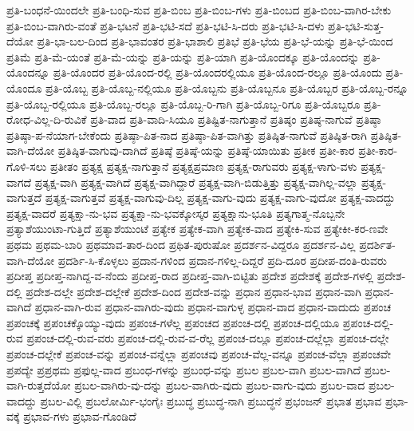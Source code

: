{ಪ್ರತಿ-ಬಂಧನೆ-ಯಿಂದಲೇ
ಪ್ರತಿ-ಬಂಧಿ-ಸುವ
ಪ್ರತಿ-ಬಿಂಬ
ಪ್ರತಿ-ಬಿಂಬ-ಗಳು
ಪ್ರತಿ-ಬಿಂಬದ
ಪ್ರತಿ-ಬಿಂಬ-ವಾಗಿರ-ಬೇಕು
ಪ್ರತಿ-ಬಿಂಬ-ವಾಗಿರು-ವಂತೆ
ಪ್ರತಿ-ಭಟನೆ
ಪ್ರತಿ-ಭಟಿ-ಸದೆ
ಪ್ರತಿ-ಭಟಿ-ಸಿ-ದರು
ಪ್ರತಿ-ಭಟಿ-ಸಿ-ದಳು
ಪ್ರತಿ-ಭಟಿ-ಸುತ್ತ-ದೆಯೋ
ಪ್ರತಿ-ಭಾ-ಬಲ-ದಿಂದ
ಪ್ರತಿ-ಭಾವಂತರ
ಪ್ರತಿ-ಭಾಶಾಲಿ
ಪ್ರತಿಭೆ
ಪ್ರತಿ-ಭೆಯ
ಪ್ರತಿ-ಭೆ-ಯನ್ನು
ಪ್ರತಿ-ಭೆ-ಯಿಂದ
ಪ್ರತಿಮೆ
ಪ್ರತಿ-ಮೆ-ಯಂತೆ
ಪ್ರತಿ-ಮೆ-ಯನ್ನು
ಪ್ರತಿ-ಯನ್ನು
ಪ್ರತಿ-ಯಾಗಿ
ಪ್ರತಿ-ಯೊಂದಕ್ಕೂ
ಪ್ರತಿ-ಯೊಂದನ್ನು
ಪ್ರತಿ-ಯೊಂದನ್ನೂ
ಪ್ರತಿ-ಯೊಂದರ
ಪ್ರತಿ-ಯೊಂದ-ರಲ್ಲಿ
ಪ್ರತಿ-ಯೊಂದರಲ್ಲಿಯೂ
ಪ್ರತಿ-ಯೊಂದ-ರಲ್ಲೂ
ಪ್ರತಿ-ಯೊಂದು
ಪ್ರತಿ-ಯೊಂದೂ
ಪ್ರತಿ-ಯೊಬ್ಬ
ಪ್ರತಿ-ಯೊಬ್ಬ-ನಲ್ಲಿಯೂ
ಪ್ರತಿ-ಯೊಬ್ಬನು
ಪ್ರತಿ-ಯೊಬ್ಬನೂ
ಪ್ರತಿ-ಯೊಬ್ಬರ
ಪ್ರತಿ-ಯೊಬ್ಬ-ರನ್ನೂ
ಪ್ರತಿ-ಯೊಬ್ಬ-ರಲ್ಲಿಯೂ
ಪ್ರತಿ-ಯೊಬ್ಬ-ರಲ್ಲೂ
ಪ್ರತಿ-ಯೊಬ್ಬ-ರಿ-ಗಾಗಿ
ಪ್ರತಿ-ಯೊಬ್ಬ-ರಿಗೂ
ಪ್ರತಿ-ಯೊಬ್ಬರೂ
ಪ್ರತಿ-ರೋಧ-ವಿಲ್ಲ-ದಿ-ರುವಿಕೆ
ಪ್ರತಿ-ವಾದ
ಪ್ರತಿ-ವಾದಿ-ಸಿಯೂ
ಪ್ರತಿಷ್ಟಿತ-ನಾಗುತ್ತಾನೆ
ಪ್ರತಿಷ್ಠಂ
ಪ್ರತಿಷ್ಠ-ನಾಗುವೆ
ಪ್ರತಿಷ್ಠಾ
ಪ್ರತಿಷ್ಠಾ-ಪ-ನೆಯಾಗ-ಬೇಕೆಂದು
ಪ್ರತಿಷ್ಠಾ-ಪಿತ-ನಾದ
ಪ್ರತಿಷ್ಠಾ-ಪಿತ-ವಾಗಿತ್ತು
ಪ್ರತಿಷ್ಠಿತ-ನಾಗುವೆ
ಪ್ರತಿಷ್ಠಿತ-ರಾಗಿ
ಪ್ರತಿಷ್ಠಿತ-ವಾಗಿ-ದೆಯೋ
ಪ್ರತಿಷ್ಠಿತ-ವಾಗುವು-ದಾಗಿದೆ
ಪ್ರತಿಷ್ಠೆ
ಪ್ರತಿಷ್ಠೆ-ಯನ್ನು
ಪ್ರತಿಷ್ಠೆ-ಯಾಯಿತು
ಪ್ರತೀಕ
ಪ್ರತೀ-ಕಾರ
ಪ್ರತೀ-ಕಾರ-ಗೊಳಿ-ಸಲು
ಪ್ರತೀತಂ
ಪ್ರತ್ಯಕ್ಷ
ಪ್ರತ್ಯಕ್ಷ-ನಾಗುತ್ತಾನೆ
ಪ್ರತ್ಯಕ್ಷಪ್ರಮಾಣ
ಪ್ರತ್ಯಕ್ಷ-ರಾಗುವರು
ಪ್ರತ್ಯಕ್ಷ-ಳಾಗು-ವಳು
ಪ್ರತ್ಯಕ್ಷ-ವಾಗದೆ
ಪ್ರತ್ಯಕ್ಷ-ವಾಗಿ
ಪ್ರತ್ಯಕ್ಷ-ವಾಗಿದೆ
ಪ್ರತ್ಯಕ್ಷ-ವಾಗಿದ್ದಾರೆ
ಪ್ರತ್ಯಕ್ಷ-ವಾಗಿ-ಬಿಡುತ್ತಿತ್ತು
ಪ್ರತ್ಯಕ್ಷ-ವಾಗಿಲ್ಲ-ವಲ್ಲಾ
ಪ್ರತ್ಯಕ್ಷ-ವಾಗುತ್ತದೆ
ಪ್ರತ್ಯಕ್ಷ-ವಾಗುತ್ತವೆ
ಪ್ರತ್ಯಕ್ಷ-ವಾಗುವು-ದಿಲ್ಲ
ಪ್ರತ್ಯಕ್ಷ-ವಾಗು-ವುದು
ಪ್ರತ್ಯಕ್ಷ-ವಾಗು-ವುದೋ
ಪ್ರತ್ಯಕ್ಷ-ವಾದದ್ದು
ಪ್ರತ್ಯಕ್ಷ-ವಾದರೆ
ಪ್ರತ್ಯಕ್ಷಾ-ನು-ಭವ
ಪ್ರತ್ಯಕ್ಷಾ-ನು-ಭವಕ್ಕೋಸ್ಕರ
ಪ್ರತ್ಯಕ್ಷಾನು-ಭೂತಿ
ಪ್ರತ್ಯಗಾತ್ಮ-ನೊಬ್ಬನೇ
ಪ್ರತ್ಯಾಶೆಯುಂಟಾ-ಗುತ್ತಿದೆ
ಪ್ರತ್ಯಾಶೆಯುಂಟೆ
ಪ್ರತ್ಯೇಕ
ಪ್ರತ್ಯೇಕ-ವಾಗಿ
ಪ್ರತ್ಯೇಕ-ವಾದ
ಪ್ರತ್ಯೇಕಿ-ಸುವ
ಪ್ರತ್ಯೇಕೀ-ಕರ-ಣವೇ
ಪ್ರಥಮ
ಪ್ರಥಮ-ಬಾರಿ
ಪ್ರಥಮಾವ-ತಾರ-ದಿಂದ
ಪ್ರಥಿತ-ಪುರುಷೋ
ಪ್ರದರ್ಶನ-ವಿದ್ದರೂ
ಪ್ರದರ್ಶನ-ವಿಲ್ಲ
ಪ್ರದರ್ಶಿತ-ವಾಗಿ-ದೆಯೋ
ಪ್ರದರ್ಶಿ-ಸಿ-ಕೊಳ್ಳಲು
ಪ್ರದಾನ-ಗಳಿಂದ
ಪ್ರದಾನ-ಗಳಿಲ್ಲ-ದಿದ್ದರೆ
ಪ್ರದಿ-ದೂರ
ಪ್ರದೀಪ-ದಂತಿ-ರುವರು
ಪ್ರದೀಪ್ತ
ಪ್ರದೀಪ್ತ-ನಾಗಿದ್ದ-ವ-ನೆಂದು
ಪ್ರದೀಪ್ತ-ರಾದ
ಪ್ರದೀಪ್ತ-ವಾಗಿ-ಬಿಟ್ಟಿತು
ಪ್ರದೇಶ
ಪ್ರದೇಶಕ್ಕೆ
ಪ್ರದೇಶ-ಗಳಲ್ಲಿ
ಪ್ರದೇಶ-ದಲ್ಲಿ
ಪ್ರದೇಶ-ದಲ್ಲೇ
ಪ್ರದೇಶ-ದಲ್ಲೇಕೆ
ಪ್ರದೇಶ-ದಿಂದ
ಪ್ರದೇಶ-ವನ್ನು
ಪ್ರಧಾನ
ಪ್ರಧಾನ-ಭಾವ
ಪ್ರಧಾನ-ವಾಗಿ
ಪ್ರಧಾನ-ವಾಗಿದೆ
ಪ್ರಧಾನ-ವಾಗಿ-ರುವ
ಪ್ರಧಾನ-ವಾಗಿರು-ವುದು
ಪ್ರಧಾನ-ವಾಗುಳ್ಳ
ಪ್ರಧಾನ-ವಾದ
ಪ್ರಧಾನ-ವಾದುದು
ಪ್ರಪಂಚ
ಪ್ರಪಂಚಕ್ಕೆ
ಪ್ರಪಂಚಕ್ಕೊಯ್ಯು-ವುದು
ಪ್ರಪಂಚ-ಗಳೆಲ್ಲ
ಪ್ರಪಂಚದ
ಪ್ರಪಂಚ-ದಲ್ಲಿ
ಪ್ರಪಂಚ-ದಲ್ಲಿಯೂ
ಪ್ರಪಂಚ-ದಲ್ಲಿ-ರುವ
ಪ್ರಪಂಚ-ದಲ್ಲಿ-ರುವ-ವರು
ಪ್ರಪಂಚ-ದಲ್ಲಿ-ರುವ-ವ-ರೆಲ್ಲ
ಪ್ರಪಂಚ-ದಲ್ಲೂ
ಪ್ರಪಂಚ-ದಲ್ಲೆಲ್ಲಾ
ಪ್ರಪಂಚ-ದಲ್ಲೇ
ಪ್ರಪಂಚ-ದಲ್ಲೇಕೆ
ಪ್ರಪಂಚ-ವನ್ನು
ಪ್ರಪಂಚ-ವನ್ನೆಲ್ಲಾ
ಪ್ರಪಂಚವು
ಪ್ರಪಂಚ-ವೆಲ್ಲ-ವನ್ನೂ
ಪ್ರಪಂಚ-ವೆಲ್ಲಾ
ಪ್ರಪಂಚವೇ
ಪ್ರಪದ್ಯೇ
ಪ್ರಪ್ರಥಮ
ಪ್ರಫುಲ್ಲ-ವಾದ
ಪ್ರಬಂಧ-ಗಳನ್ನು
ಪ್ರಬಂಧ-ವನ್ನು
ಪ್ರಬಲ
ಪ್ರಬಲ-ವಾಗಿ
ಪ್ರಬಲ-ವಾಗಿದೆ
ಪ್ರಬಲ-ವಾಗಿ-ರುತ್ತದೆಯೋ
ಪ್ರಬಲ-ವಾಗಿರು-ವು-ದನ್ನು
ಪ್ರಬಲ-ವಾಗಿರು-ವುದು
ಪ್ರಬಲ-ವಾಗು-ವುದು
ಪ್ರಬಲ-ವಾದ
ಪ್ರಬಲ-ವಾದದ್ದು
ಪ್ರಬಲ-ವಿಲ್ಲಿ
ಪ್ರಬಲೋರ್ಮಿ-ಭಂಗೈಃ
ಪ್ರಬುದ್ಧ
ಪ್ರಬುದ್ಧ-ನಾಗಿ
ಪ್ರಬುದ್ಧನೆ
ಪ್ರಭಂಜನ್
ಪ್ರಭಾತ
ಪ್ರಭಾವ
ಪ್ರಭಾ-ವಕ್ಕೆ
ಪ್ರಭಾವ-ಗಳು
ಪ್ರಭಾವ-ಗೊಂಡಿದೆ
}
